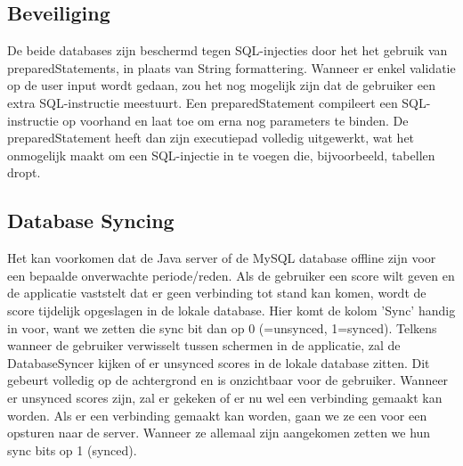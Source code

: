 \documentclass[11pt,a4paper]{article}
\begin{document}
	
	
	\subsection{Beveiliging}
	\label{sec:Beveiliging}
	De beide databases zijn beschermd tegen SQL-injecties door het het gebruik van preparedStatements, in plaats van String formattering. Wanneer er enkel validatie op de user input wordt gedaan, zou het nog mogelijk zijn dat de gebruiker een extra SQL-instructie meestuurt.
	Een preparedStatement compileert een SQL-instructie op voorhand en laat toe om erna nog parameters te binden. De preparedStatement heeft dan zijn executiepad volledig uitgewerkt, wat het onmogelijk maakt om een SQL-injectie in te voegen die, bijvoorbeeld, tabellen dropt. 
	
	
	\subsection{Database Syncing}
	\label{sec:Database Syncing}
	Het kan voorkomen dat de Java server of de MySQL database offline zijn voor een bepaalde onverwachte periode/reden. Als de gebruiker een score wilt geven en de applicatie vaststelt dat er geen verbinding tot stand kan komen, wordt de score tijdelijk opgeslagen in de lokale database. Hier komt de kolom 'Sync' handig in voor, want we zetten die sync bit dan op 0 (=unsynced, 1=synced). Telkens wanneer de gebruiker verwisselt tussen schermen in de applicatie, zal de DatabaseSyncer kijken of er unsynced scores in de lokale database zitten. Dit gebeurt volledig op de achtergrond en is onzichtbaar voor de gebruiker. Wanneer er unsynced scores zijn, zal er gekeken of er nu wel een verbinding gemaakt kan worden. Als er een verbinding gemaakt kan worden, gaan we ze een voor een opsturen naar de server. Wanneer ze allemaal zijn aangekomen zetten we hun sync bits op 1 (synced).
		
\end{document}
